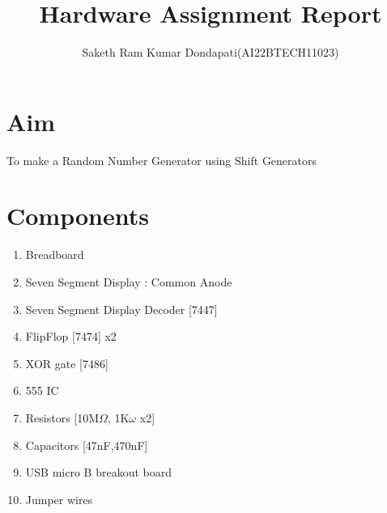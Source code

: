 \documentclass{article}
\begin{document}
\title{Hardware Assignment Report}
\author{Saketh Ram Kumar Dondapati(AI22BTECH11023)}
\date{}
\maketitle

\section{Aim}
To make a Random Number Generator using Shift Generators

\section{Components}
\begin{enumerate}    
    \item Breadboard
    \item Seven Segment Display : Common Anode
    \item Seven Segment Display Decoder [7447]
    \item FlipFlop [7474] x2
    \item XOR gate [7486]
    \item 555 IC
    \item Resistors [10M$\Omega$, 1K$\omega$ x2]
    \item Capacitors [47nF,470nF]
    \item USB micro B breakout board
    \item Jumper wires
\end{enumerate}
\end{document}
